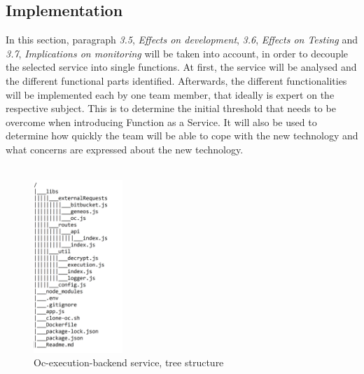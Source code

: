 \documentclass[a4paper,twoside,11pt, pagesize]{scrartcl}
\begin{document}
\begin{spacing}{1.2}
\subsection{Implementation}
In this section, paragraph \textit{3.5}, \textit{Effects on development}, \textit{3.6}, \textit{Effects on Testing} and \textit{3.7}, \textit{Implications on monitoring} will be taken into account, in order to decouple the selected service into single functions. At first, the service will be analysed and the different functional parts identified. Afterwards, the different functionalities will be implemented each by one team member, that ideally is expert on the respective subject. This is to determine the initial threshold that needs to be overcome when introducing Function as a Service. It will also be used to determine how quickly the team will be able to cope with the new technology and what concerns are expressed about the new technology.\\\\
\begin{figure}[H]
\label{fig:tree}
\centering
\includegraphics[width=0.3\textwidth]{tree.png}
\caption{Oc-execution-backend service, tree structure}
\end{figure}

\end{spacing}
\end{document}
